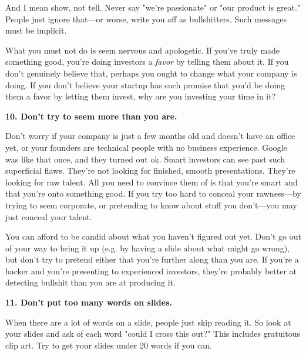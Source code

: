 And I mean show, not tell.
                    Never say "we're passionate" or "our product is great."
                    People just ignore that---or worse, write you off as
                    bullshitters. Such messages must be implicit.

What
                    you must not do is seem nervous and apologetic. If you've
                    truly made something good, you're doing investors a
                    \emph{favor} by telling them about it. If you don't
                    genuinely believe that, perhaps you ought to change what
                    your company is doing. If you don't believe your startup has
                    such promise that you'd be doing them a favor by letting
                    them invest, why are you investing your time in it?

\textbf{10. Don't try to seem more than you are.}

Don't worry if your company is just a few
                    months old and doesn't have an office yet, or your founders
                    are technical people with no business experience. Google was
                    like that once, and they turned out ok. Smart investors can
                    see past such superficial flaws. They're not looking for
                    finished, smooth presentations. They're looking for raw
                    talent. All you need to convince them of is that you're
                    smart and that you're onto something good. If you try too
                    hard to conceal your rawness---by trying to seem
                    corporate, or pretending to know about stuff you
                    don't---you may just conceal your talent.

You
                    can afford to be candid about what you haven't figured out
                    yet. Don't go out of your way to bring it up (e.g. by having
                    a slide about what might go wrong), but don't try to pretend
                    either that you're further along than you are. If you're a
                    hacker and you're presenting to experienced investors,
                    they're probably better at detecting bullshit than you are
                    at producing it.

\textbf{11. Don't put too many words on slides.}

When there are a lot of words on a slide,
                    people just skip reading it. So look at your slides and ask
                    of each word "could I cross this out?" This includes
                    gratuitous clip art. Try to get your slides under 20 words
                    if you can.

